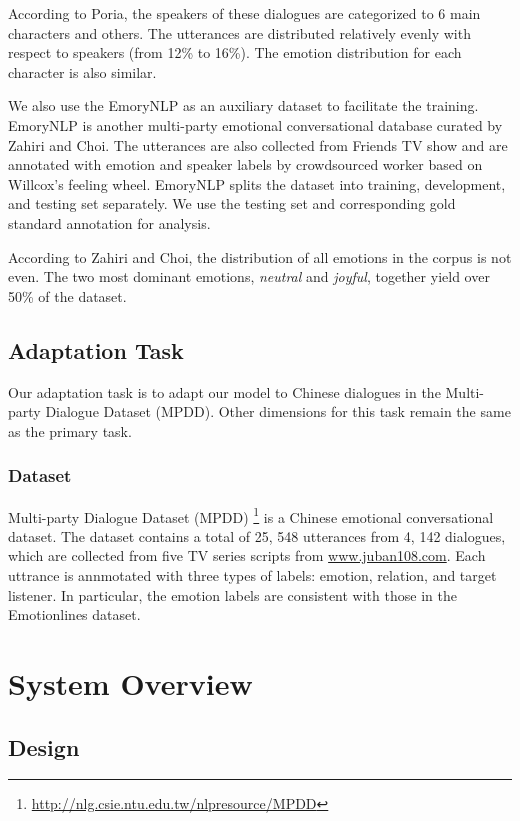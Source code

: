 \documentclass[11pt]{article}
\begin{document}
According to Poria, the speakers of these dialogues are categorized to 6 main characters and others. The utterances are distributed relatively evenly with respect to speakers (from 12\% to 16\%).  The emotion distribution for each character is also similar. 

We also use the EmoryNLP \citep{EmoryNLP} as an auxiliary dataset to facilitate the training. EmoryNLP is another multi-party emotional conversational database curated by Zahiri and Choi. The utterances are also collected from Friends TV show and are annotated with emotion and speaker labels by crowdsourced worker based on Willcox's feeling wheel. EmoryNLP splits the dataset into training, development, and testing set separately. We use the testing set and corresponding gold standard annotation for analysis. 

According to Zahiri and Choi, the distribution of all emotions in the corpus is not even. The two most dominant emotions, \textit{neutral} and \textit{joyful}, together yield over 50\% of the dataset.

\subsection{Adaptation Task}
\label{sect:adaptation_task}

Our adaptation task is to adapt our model to Chinese dialogues in the Multi-party Dialogue Dataset (MPDD). Other dimensions for this task remain the same as the primary task.

\subsubsection{Dataset}

Multi-party Dialogue Dataset (MPDD) \citep{chen-etal-2020-mpdd} \footnote{\url{http://nlg.csie.ntu.edu.tw/nlpresource/MPDD}} is a Chinese emotional conversational dataset. The dataset contains a total of 25, 548 utterances from 4, 142 dialogues, which are collected from five TV series scripts from \url{www.juban108.com}. Each uttrance is annmotated with three types of labels: emotion, relation, and target listener. In particular, the emotion labels are consistent with those in the Emotionlines dataset.


\section{System Overview}
\label{sec:overview}

\subsection{Design}
\end{document}
